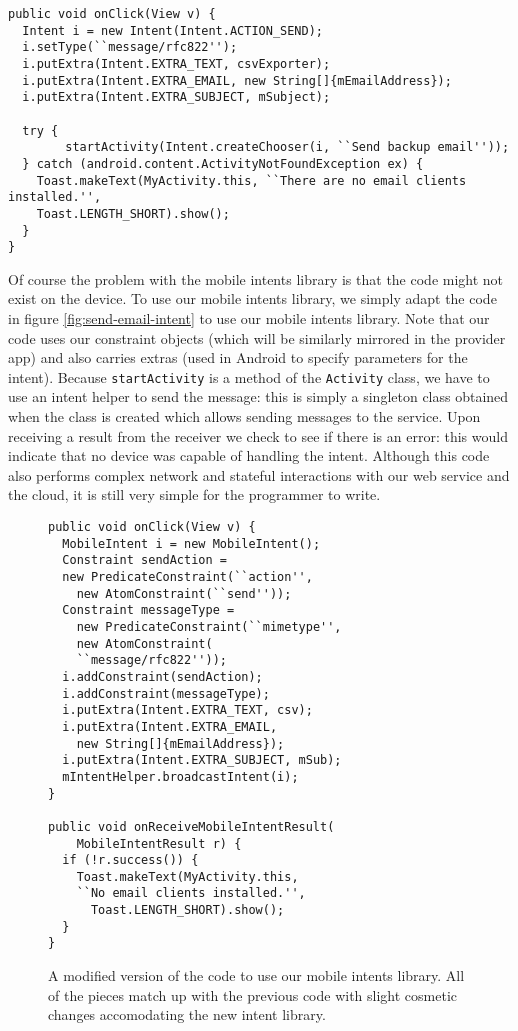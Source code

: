 \documentclass{acm_proc_article-sp}
\begin{document}
\begin{figure*}
  \label{fig:send-email-intent}
  \begin{lstlisting}
public void onClick(View v) {
  Intent i = new Intent(Intent.ACTION_SEND);
  i.setType(``message/rfc822'');
  i.putExtra(Intent.EXTRA_TEXT, csvExporter);
  i.putExtra(Intent.EXTRA_EMAIL, new String[]{mEmailAddress});
  i.putExtra(Intent.EXTRA_SUBJECT, mSubject);
      
  try {
        startActivity(Intent.createChooser(i, ``Send backup email''));
  } catch (android.content.ActivityNotFoundException ex) {
    Toast.makeText(MyActivity.this, ``There are no email clients installed.'',
    Toast.LENGTH_SHORT).show();
  }
}
  \end{lstlisting}
  \caption{Backing up the contents of the database to an email account
    using the normal Android platform, using a standard
    \texttt{ACTION\_SEND} intent to accomplish the task.}
\end{figure*}

Of course the problem with the mobile intents library is that the code
might not exist on the device.  To use our mobile intents library, we
simply adapt the code in figure \ref{fig:send-email-intent} to use our
mobile intents library.  Note that our code uses our constraint
objects (which will be similarly mirrored in the provider app) and
also carries extras (used in Android to specify parameters for the
intent).  Because \texttt{startActivity} is a method of the
\texttt{Activity} class, we have to use an intent helper to send the
message: this is simply a singleton class obtained when the class is
created which allows sending messages to the service.  Upon receiving
a result from the receiver we check to see if there is an error: this
would indicate that no device was capable of handling the intent.
Although this code also performs complex network and stateful
interactions with our web service and the cloud, it is still very
simple for the programmer to write.

\begin{figure}[t]
  \label{fig:mobile-intents-email-example}
  \begin{lstlisting}
public void onClick(View v) {
  MobileIntent i = new MobileIntent();
  Constraint sendAction = 
  new PredicateConstraint(``action'', 
    new AtomConstraint(``send''));
  Constraint messageType = 
    new PredicateConstraint(``mimetype'', 
    new AtomConstraint(
    ``message/rfc822''));
  i.addConstraint(sendAction);
  i.addConstraint(messageType);
  i.putExtra(Intent.EXTRA_TEXT, csv);
  i.putExtra(Intent.EXTRA_EMAIL,
    new String[]{mEmailAddress});
  i.putExtra(Intent.EXTRA_SUBJECT, mSub);
  mIntentHelper.broadcastIntent(i);
}

public void onReceiveMobileIntentResult(
    MobileIntentResult r) {
  if (!r.success()) {
    Toast.makeText(MyActivity.this,
    ``No email clients installed.'',
      Toast.LENGTH_SHORT).show();
  }
}
\end{lstlisting}
\caption{A modified version of the code to use our mobile intents
  library.  All of the pieces match up with the previous code with
  slight cosmetic changes accomodating the new intent library.}
\end{figure}
\end{document}
